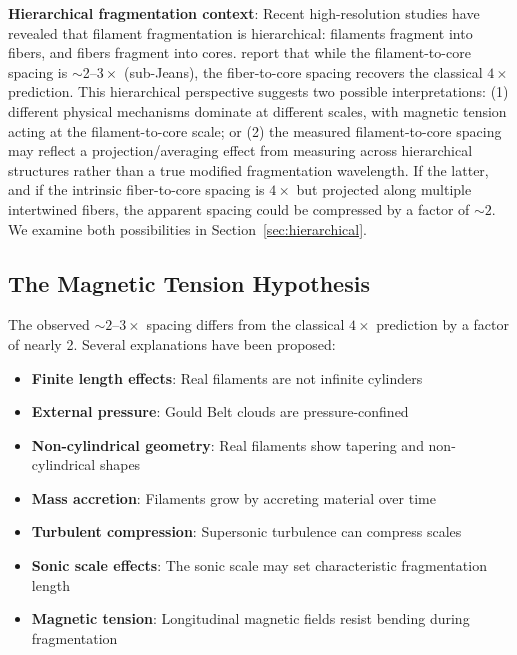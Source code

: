 \documentclass[11pt,a4paper]{article}
\begin{document}
\textbf{Hierarchical fragmentation context}: Recent high-resolution studies \citep{Yang2024} have revealed that filament fragmentation is hierarchical: filaments fragment into fibers, and fibers fragment into cores. \citet{Yang2024} report that while the filament-to-core spacing is $\sim$2--$3\times$ (sub-Jeans), the fiber-to-core spacing recovers the classical $4\times$ prediction. This hierarchical perspective suggests two possible interpretations: (1) different physical mechanisms dominate at different scales, with magnetic tension acting at the filament-to-core scale; or (2) the measured filament-to-core spacing may reflect a projection/averaging effect from measuring across hierarchical structures rather than a true modified fragmentation wavelength. If the latter, and if the intrinsic fiber-to-core spacing is $4\times$ but projected along multiple intertwined fibers, the apparent spacing could be compressed by a factor of $\sim2$. We examine both possibilities in Section~\ref{sec:hierarchical}.

\subsection{The Magnetic Tension Hypothesis}

The observed $\sim2$--$3\times$ spacing differs from the classical $4\times$ prediction by a factor of nearly 2. Several explanations have been proposed:

\begin{itemize}
    \item \textbf{Finite length effects}: Real filaments are not infinite cylinders \citep{Inutsuka1997}
    \item \textbf{External pressure}: Gould Belt clouds are pressure-confined \citep{Fischera2012}
    \item \textbf{Non-cylindrical geometry}: Real filaments show tapering and non-cylindrical shapes
    \item \textbf{Mass accretion}: Filaments grow by accreting material over time \citep{Heitsch2013, Chen2024}
    \item \textbf{Turbulent compression}: Supersonic turbulence can compress scales \citep{Padoan2011}
    \item \textbf{Sonic scale effects}: The sonic scale may set characteristic fragmentation length \citep{Federrath2016}
    \item \textbf{Magnetic tension}: Longitudinal magnetic fields resist bending during fragmentation
\end{itemize}
\end{document}
